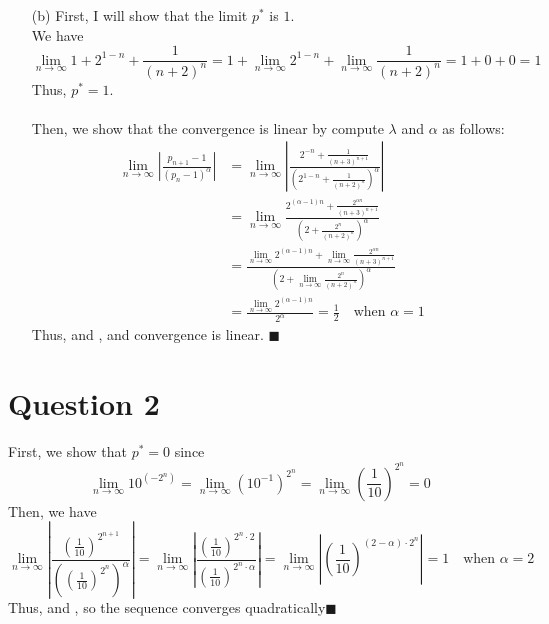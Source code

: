 \documentclass[11pt]{article}
\newcommand*{\boxtex}[1]{\framebox{#1}}
\begin{document}
\begin{itemize}
	\item[(b)]
	First, I will show that the limit $ p^* $ is $ 1 $.\\
	We have \[ \lim_{n \rightarrow \infty} 1+ 2^{1-n} +\frac{1}{(n+2)^n} = 1+ \lim_{n \rightarrow \infty}2^{1-n} + \lim_{n \rightarrow \infty} \frac{1}{(n+2)^n} = 1+0+0 = 1 \]
	Thus, $ p^*  = 1$.\\\\
	Then, we show that the convergence is linear by compute $ \lambda $ and $ \alpha $ as follows:\\
	\begin{equation*}
	\begin{aligned}
	\lim_{n \rightarrow \infty} \left|\frac{p_{n+1} - 1}{(p_n-1)^\alpha}\right| &= \lim_{n \rightarrow \infty} \left|\frac{2^{-n}+\frac{1}{(n+3)^{n+1}}}{(2^{1-n} + \frac{1}{(n+2)^n})^\alpha}\right|\\
	&= \lim_{n \rightarrow \infty} \frac{2^{(\alpha-1)n} + \frac{2^{\alpha n}}{(n+3)^{n+1}}}{ \left(2 + \frac{2^n}{(n+2)^n} \right)^\alpha} \\
	&= \frac{\lim_{n \rightarrow \infty} 2^{(\alpha-1)n} + \lim_{n \rightarrow \infty} \frac{2^{\alpha n}}{(n+3)^{n+1}}}{ \left( 2 + \lim_{n \rightarrow \infty} \frac{2^n}{(n+2)^n} \right)^\alpha }\\
	&= \frac{\lim_{n \rightarrow \infty} 2 ^{(\alpha -1)n}}{2^\alpha} = \frac{1}{2} \quad \text{when } \alpha = 1
	\end{aligned}
	\end{equation*}
	Thus, \boxtex{$ \alpha = 1 $} and \boxtex{$ \lambda = \frac{1}{2} $}, and convergence is linear. \hfill $ \blacksquare $
\end{itemize}

\section*{Question 2}
First, we show that $ p^*  = 0$ since
\[ \lim_{n \rightarrow \infty} 10^{(-2^n)} = \lim_{n \rightarrow \infty} \left(10^{-1}\right)^{2^n} = \lim_{n \rightarrow \infty} \left( \frac{1}{10}\right)^{2^n}  = 0\]
Then, we have 
\[ \lim_{n \rightarrow \infty} \left|\frac{ \left(\frac{1}{10}\right)^{2^{n+1}} }{ \left( \left(\frac{1}{10}\right)^{2^{n}} \right)^\alpha }\right| = \lim_{n \rightarrow \infty} \left|\frac{ \left(\frac{1}{10}\right)^{2^{n}\cdot 2} }{  \left(\frac{1}{10}\right)^{2^{n}\cdot \alpha}  }\right| = \lim_{n \rightarrow \infty} \left| \left( \frac{1}{10}\right)^{(2-\alpha)\cdot 2^n} \right| = 1 \quad\text{when } \alpha = 2\] 
Thus, \boxtex{$ \alpha =2 $} and \boxtex{$ \lambda = 1 $}, so the sequence converges quadratically\hfill $ \blacksquare $
\end{document}
